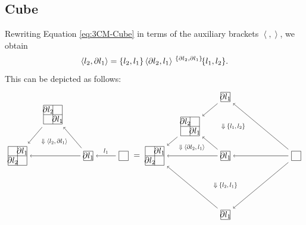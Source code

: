 \documentclass[11pt, reqno]{amsart} %
\newcommand{\act}[1]{\,\sp{#1}\!}
\newcommand{\strrect}[3][]{
  \begin{scope}[every node/.append style={overlay},#1]
    \foreach \x [count=\i] in {#3}{
      \ifx\x\empty
      \else
        \pgfmathsetmacro{\modResult}{mod(\i-1, #2)}
        \pgfmathsetmacro{\quotResult}{(\i-\modResult-1)/#2}
        \node at (\modResult,-\quotResult) {\x};
      \fi
    }
    \foreach \x in {0,1,...,#2}{
      \draw ({-1/2+\x},{1/2})--({-1/2+\x},{-#2+1/2});
      \draw ({-1/2},{1/2-\x})--({#2-1/2},{1/2-\x});
    }
  \end{scope}
}
\theoremstyle{definition}
\theoremstyle{remark}
\numberwithin{equation}{section}
\begin{document}
\subsection{Cube}
Rewriting Equation \eqref{eq:3CM-Cube} in terms of the auxiliary brackets $\left<,\right>$, we obtain
\begin{equation}
  \label{eq:3-CM-aux-Cube}
  \left<l_2,\partial l_1\right>
  = 
  \{l_2,l_1\}
  \left<\partial l_2,l_1\right>
  \act{\{\partial l_2,\partial l_1\}}\{l_1,l_2\}.
\end{equation}
This can be depicted as follows:
\[
  \begin{tikzpicture}[baseline=-2pt]
    \node (A) at (3,0) {\tikz[baseline=-2pt,scale=.4]{\strrect{1}{}}};
    \node (B) at (1.5,0) {\tikz[baseline=-2pt,scale=.4]{\strrect{1}{$\partial l_1$}}};
    \node (C) at (0,1.75) {\tikz[baseline=-2pt,scale=.4]{\strrect{2}{$\partial l_2$,,,$\partial l_1$}}};
    \node (D) at (-1.5,0) {\tikz[baseline=-2pt,scale=.4]{\strrect{2}{,$\partial l_1$,$\partial l_2$,}}};
    \draw [->] (A) to node [transform shape,scale=.75,anchor=south] {$l_1$} (B);
    \draw [->] (B) to coordinate (E) (D);
    \draw [->] (B) to (C);
    \draw [->] (C) to (D);
    \path (C) to node [transform shape,scale=.75] {$\Downarrow \left<l_2,\partial l_1\right>$} (E); 
  \end{tikzpicture}
  =
  \begin{tikzpicture}[baseline=-2pt]
    \node (A) at (3,0) {\tikz[baseline=-2pt,scale=.4]{\strrect{1}{}}};
    \node (B1) at (0,2.5) {\tikz[baseline=-2pt,scale=.4]{\strrect{1}{$\partial l_1$}}};
    \node (B2) at (0,0) {\tikz[baseline=-2pt,scale=.4]{\strrect{1}{$\partial l_1$}}};
    \node (B3) at (0,-2.5) {\tikz[baseline=-2pt,scale=.4]{\strrect{1}{$\partial l_1$}}};
    \node (C) at (-1.5,1.25) {\tikz[baseline=-2pt,scale=.4]{\strrect{2}{$\partial l_2$,,,$\partial l_1$}}};
    \node (D) at (-3,0) {\tikz[baseline=-2pt,scale=.4]{\strrect{2}{,$\partial l_1$,$\partial l_2$,}}};
    \draw [->] (A) to (B1);
    \draw [->] (A) to (B2);
    \draw [->] (A) to (B3);
    \draw [->] (B1) to (C);
    \draw [->] (B2) to (C);
    \draw [->] (B2) to coordinate (E) (D);
    \draw [->] (B3) to (D);
    \draw [->] (C) to (D);
    \path (C) to node [transform shape,scale=.75] {$\Downarrow \left<\partial l_2,l_1\right>$} (E);
    \path (B1.east) to node [transform shape,scale=.75] {$\Downarrow \{l_1,l_2\}$} (B2.east);
    \path (B2) to node [transform shape,scale=.75] {$\Downarrow \{l_2,l_1\}$} (B3);
  \end{tikzpicture}
\]
\end{document}
